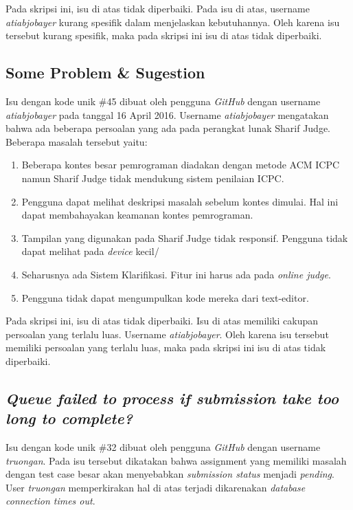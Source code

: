 Pada skripsi ini, isu di atas tidak diperbaiki. Pada isu di atas, username \textit{atiabjobayer} kurang spesifik dalam menjelaskan kebutuhannya.
Oleh karena isu tersebut kurang spesifik, maka pada skripsi ini isu di atas tidak diperbaiki.

\subsection{Some Problem \& Sugestion}
Isu dengan kode unik \#45 dibuat oleh pengguna \textit{GitHub} dengan username \textit{atiabjobayer} pada tanggal 16 April 2016. Username \textit{atiabjobayer} mengatakan bahwa ada beberapa persoalan yang ada pada perangkat lunak Sharif Judge. Beberapa masalah tersebut yaitu:
	\begin{enumerate}
		\item Beberapa kontes besar pemrograman diadakan dengan metode ACM ICPC namun Sharif Judge tidak mendukung sistem penilaian ICPC.
		\item Pengguna dapat melihat deskripsi masalah sebelum kontes dimulai. Hal ini dapat membahayakan keamanan kontes pemrograman.
		\item Tampilan yang digunakan pada Sharif Judge tidak responsif. Pengguna tidak dapat melihat pada \textit{device} kecil/
		\item Seharusnya ada Sistem Klarifikasi. Fitur ini harus ada pada \textit{online judge}.
		\item Pengguna tidak dapat mengumpulkan kode mereka dari text-editor.
	\end{enumerate}

Pada skripsi ini, isu di atas tidak diperbaiki. Isu di atas memiliki cakupan persoalan yang terlalu luas. Username \textit{atiabjobayer}. Oleh karena isu tersebut memiliki persoalan yang terlalu luas, maka pada skripsi ini isu di atas tidak diperbaiki.
	
\subsection{\textit{Queue failed to process if submission take too long to complete?}}
Isu dengan kode unik \#32 dibuat oleh pengguna \textit{GitHub} dengan username \textit{truongan}. Pada isu tersebut dikatakan bahwa assignment yang memiliki masalah dengan test case besar akan menyebabkan \textit{submission status} menjadi \textit{pending}. User \textit{truongan} memperkirakan hal di atas terjadi dikarenakan \textit{database connection times out}. 

